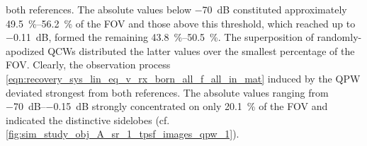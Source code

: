 both references.
The absolute values below
\SI{-70}{\deci\bel} constituted
approximately \SIrange{49.5}{56.2}{\percent} of
the \ac{FOV} and
those above this threshold, which reached up to
\SI{-0.11}{\deci\bel}, formed
the remaining \SIrange{43.8}{50.5}{\percent}.
The superposition of
randomly-apodized \acp{QCW} distributed
the latter values over
the smallest percentage of
the \ac{FOV}.
Clearly,
the observation process
\eqref{eqn:recovery_sys_lin_eq_v_rx_born_all_f_all_in_mat} induced by
the \ac{QPW} deviated
strongest from
both references.
The absolute values ranging from
\SIrange{-70}{-0.15}{\deci\bel} strongly concentrated on
only \SI{20.1}{\percent} of
the \ac{FOV} and indicated
the distinctive sidelobes
(cf. \cref{fig:sim_study_obj_A_sr_1_tpsf_images_qpw_1}).
